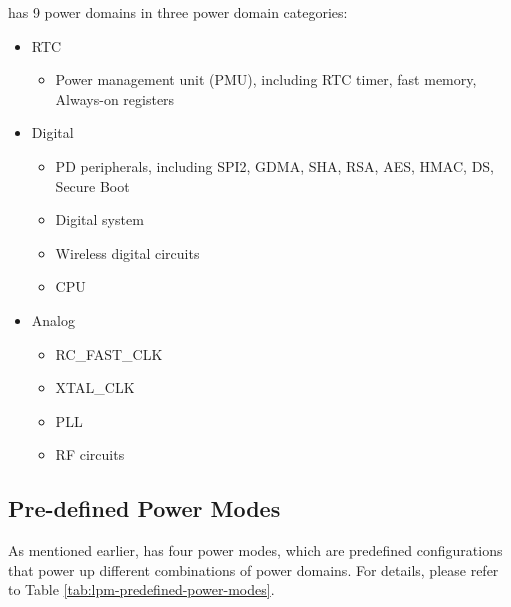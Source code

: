 \documentclass[main\_\_EN.tex]{subfiles}
\begin{document}
\chipname{} has 9 power domains in three power domain categories:
\begin{itemize}
    \item RTC
        \begin{itemize}
            \item Power management unit (PMU), including RTC timer, fast memory, Always-on registers
        \end{itemize}
    \item Digital
        \begin{itemize}
            \item PD peripherals, including SPI2, GDMA, SHA, RSA, AES, HMAC, DS, Secure Boot
            \item Digital system
            \item Wireless digital circuits
            \item CPU
        \end{itemize}
    \item Analog
    \begin{itemize}
        \item RC\_FAST\_CLK
        \item XTAL\_CLK
        \item PLL
        \item RF circuits
    \end{itemize}
\end{itemize}


\subsection{Pre-defined Power Modes}
As mentioned earlier, \chipname{} has four power modes, which are predefined configurations that power up different combinations of power domains. For details, please refer to Table \ref{tab:lpm-predefined-power-modes}.
\end{document}

